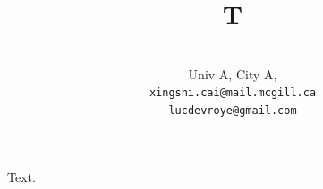 \documentclass[12pt]{scrartcl}
\title{T}
\author{\small \myauthors
  \\
  \small
  Univ A, City A,\\
  \small
  \texttt{xingshi.cai@mail.mcgill.ca}\\
  \small
  \texttt{lucdevroye@gmail.com}
}
\begin{document}
\maketitle
Text.
\end{document}
